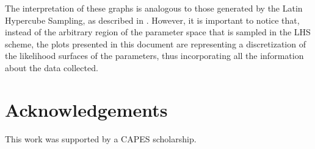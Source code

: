 \documentclass[twoside,12pt,a4paper]{article}
\begin{document}
The interpretation of these graphs is analogous to those generated by the Latin Hypercube
Sampling, as described in \citep{Chalom12}. However, it is important to notice that, instead of the 
arbitrary region of the parameter space that is sampled in the LHS scheme, the plots 
presented in this document are representing a discretization of the likelihood surfaces
of the parameters, thus incorporating all the information about the data collected.

\section*{Acknowledgements}
This work was supported by a CAPES scholarship.

\newpage


\end{document}
